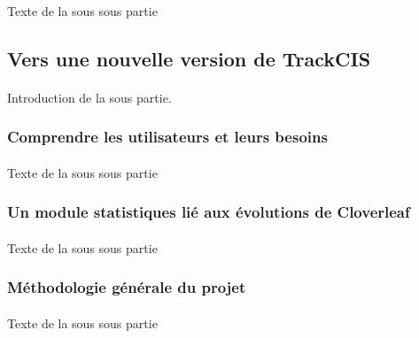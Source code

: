 			\paragraph{}
			Texte de la sous sous partie
	
	\subsection{Vers une nouvelle version de TrackCIS}
		\paragraph{}
		Introduction de la sous partie.
		
		\subsubsection{Comprendre les utilisateurs et leurs besoins}
			\paragraph{}
			Texte de la sous sous partie
		\subsubsection{Un module statistiques lié aux évolutions de Cloverleaf}
			\paragraph{}
			Texte de la sous sous partie
		\subsubsection{Méthodologie générale du projet}
			\paragraph{}
			Texte de la sous sous partie
			